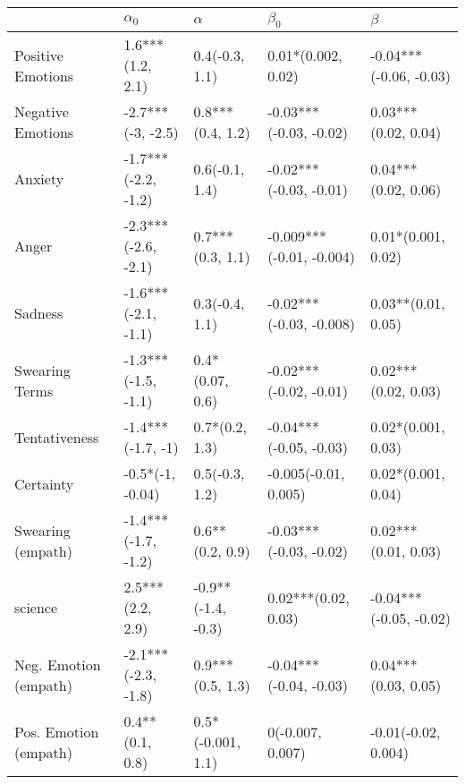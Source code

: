 \begin{tabular}{lllll}
\toprule
{} &           $\alpha_0$ &            $\alpha$ &                 $\beta_0$ &                 $\beta$ \\
\midrule
Positive Emotions     &     1.6***(1.2, 2.1) &      0.4(-0.3, 1.1) &        0.01*(0.002, 0.02) &  -0.04***(-0.06, -0.03) \\
Negative Emotions     &    -2.7***(-3, -2.5) &    0.8***(0.4, 1.2) &    -0.03***(-0.03, -0.02) &     0.03***(0.02, 0.04) \\
Anxiety               &  -1.7***(-2.2, -1.2) &      0.6(-0.1, 1.4) &    -0.02***(-0.03, -0.01) &     0.04***(0.02, 0.06) \\
Anger                 &  -2.3***(-2.6, -2.1) &    0.7***(0.3, 1.1) &  -0.009***(-0.01, -0.004) &      0.01*(0.001, 0.02) \\
Sadness               &  -1.6***(-2.1, -1.1) &      0.3(-0.4, 1.1) &   -0.02***(-0.03, -0.008) &      0.03**(0.01, 0.05) \\
Swearing Terms        &  -1.3***(-1.5, -1.1) &     0.4*(0.07, 0.6) &    -0.02***(-0.02, -0.01) &     0.02***(0.02, 0.03) \\
Tentativeness         &    -1.4***(-1.7, -1) &      0.7*(0.2, 1.3) &    -0.04***(-0.05, -0.03) &      0.02*(0.001, 0.03) \\
Certainty             &     -0.5*(-1, -0.04) &      0.5(-0.3, 1.2) &      -0.005(-0.01, 0.005) &      0.02*(0.001, 0.04) \\
Swearing (empath)     &  -1.4***(-1.7, -1.2) &     0.6**(0.2, 0.9) &    -0.03***(-0.03, -0.02) &     0.02***(0.01, 0.03) \\
science               &     2.5***(2.2, 2.9) &  -0.9**(-1.4, -0.3) &       0.02***(0.02, 0.03) &  -0.04***(-0.05, -0.02) \\
Neg. Emotion (empath) &  -2.1***(-2.3, -1.8) &    0.9***(0.5, 1.3) &    -0.04***(-0.04, -0.03) &     0.04***(0.03, 0.05) \\
Pos. Emotion (empath) &      0.4**(0.1, 0.8) &   0.5*(-0.001, 1.1) &          0(-0.007, 0.007) &     -0.01(-0.02, 0.004) \\
\bottomrule
\end{tabular}
